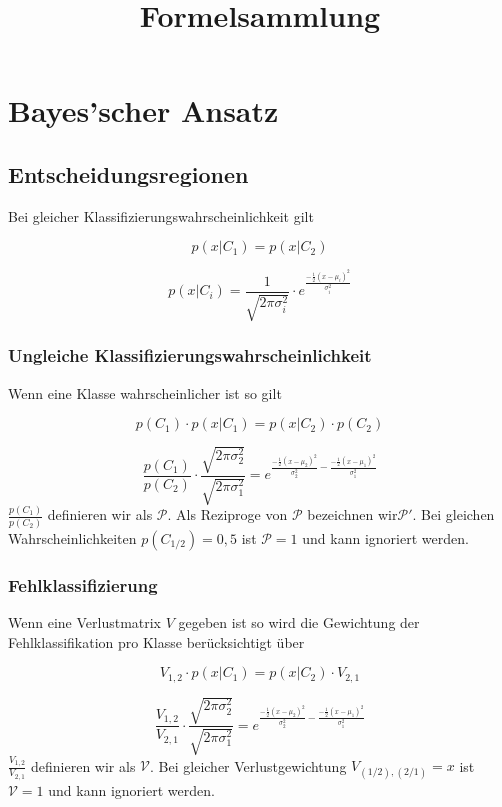 \documentclass{article}
\title{\vspace{-5mm}%
	\fontsize{24pt}{10pt}\selectfont
	\textbf{Formelsammlung}
}
\begin{document}
\maketitle	
\pagebreak

\tableofcontents
\pagebreak


\section{Bayes’scher Ansatz}

\subsection{Entscheidungsregionen}
Bei gleicher Klassifizierungswahrscheinlichkeit gilt


$$p(x|C_1) = p(x|C_2)$$

$$ p(x|C_i) = \frac{1}{\sqrt{2\pi \sigma^{2}_i}} \cdot e^{\frac{-\frac{1}{2}(x-\mu_i)^2}{\sigma_{i}^2}}$$

\subsubsection{Ungleiche Klassifizierungswahrscheinlichkeit}
Wenn eine Klasse wahrscheinlicher ist so gilt

$$p(C_1) \cdot p(x|C_1) = p(x|C_2) \cdot p(C_2)$$


$$ \frac{p(C_1)}{p(C_2)} \cdot \frac{\sqrt{2\pi \sigma^{2}_2}}{\sqrt{2\pi \sigma^{2}_1}} = e^{\frac{-\frac{1}{2}(x-\mu_2)^2}{\sigma_{2}^2} - \frac{-\frac{1}{2}(x-\mu_1)^2}{\sigma_{1}^2}} $$
$\frac{p(C_1)}{p(C_2)}$ definieren wir als $\mathcal{P}$. Als Reziproge von $\mathcal{P}$ bezeichnen wir$\mathcal{P}'$. Bei gleichen Wahrscheinlichkeiten $ p(C_{1/2}) = 0,5$ ist $\mathcal{P} = 1$ und kann ignoriert werden.

\subsubsection{Fehlklassifizierung}

Wenn eine Verlustmatrix $V$ gegeben ist so wird die Gewichtung der Fehlklassifikation pro Klasse berücksichtigt über 

$$V_{1,2} \cdot p(x|C_1) = p(x|C_2) \cdot V_{2,1}$$

$$ \frac{V_{1,2}}{V_{2,1}} \cdot \frac{\sqrt{2\pi \sigma^{2}_2}}{\sqrt{2\pi \sigma^{2}_1}} = e^{\frac{-\frac{1}{2}(x-\mu_2)^2}{\sigma_{2}^2} - \frac{-\frac{1}{2}(x-\mu_1)^2}{\sigma_{1}^2}} $$
$\frac{V_{1,2}}{V_{2,1}}$ definieren wir als $\mathcal{V}$. Bei gleicher Verlustgewichtung $ V_{(1/2),(2/1)} = x$ ist $\mathcal{V} = 1$ und kann ignoriert werden.
\end{document}
